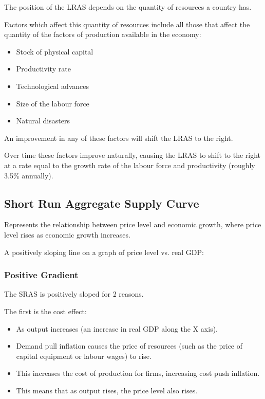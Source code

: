 \documentclass[a4paper,11pt]{article}
\begin{document}
The position of the LRAS depends on the quantity of resources a country has.

Factors which affect this quantity of resources include all those that affect
the quantity of the factors of production available in the economy:

\begin{itemize}
\item Stock of physical capital
\item Productivity rate
\item Technological advances
\item Size of the labour force
\item Natural disasters
\end{itemize}

An improvement in any of these factors will shift the LRAS to the right.

Over time these factors improve naturally, causing the LRAS to shift to the
right at a rate equal to the growth rate of the labour force and productivity
(roughly 3.5\% annually).


\subsection{Short Run Aggregate Supply Curve}

Represents the relationship between price level and economic growth, where
price level rises as economic growth increases.

A positively sloping line on a graph of price level vs. real GDP:



\subsubsection{Positive Gradient}

The SRAS is positively sloped for 2 reasons.


The first is the cost effect:

\begin{itemize}
\item As output increases (an increase in real GDP along the X axis).
\item Demand pull inflation causes the price of resources (such as the price of
	capital equipment or labour wages) to rise.
\item This increases the cost of production for firms, increasing cost push
	inflation.
\item This means that as output rises, the price level also rises.
\end{itemize}
\end{document}
